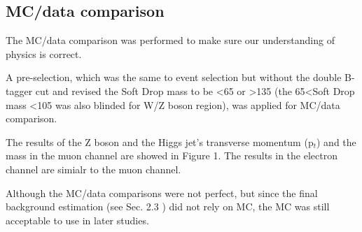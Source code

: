 \documentclass{article}
\begin{document}
\subsection{MC/data comparison}

The MC/data comparison was performed to make sure our understanding of physics is correct. 

A pre-selection, which was the same to event selection but without the double B-tagger cut and revised the Soft Drop mass to be \textless 65 or \textgreater 135 (the 65\textless Soft Drop mass \textless105 was also blinded for W/Z boson region), was applied for MC/data comparison.  

The results of the Z boson and the Higgs jet's transverse momentum (p$_{t}$) and the mass in the muon channel are showed in Figure 1. The results in the electron channel are simialr to the muon channel. 

Although the MC/data comparisons were not perfect, but since the final background estimation (see Sec. 2.3 ) did not rely on MC, the MC was still acceptable to use in later studies.
\end{document}
